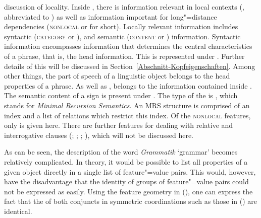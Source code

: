 discussion of locality. Inside \synsem, there is information relevant in local contexts (\local,
abbreviated to \loc) as well as information important for long"=distance dependencies
(\textsc{nonlocal} or \nonloc for short). Locally relevant information includes syntactic
(\textsc{category} or \cat), and semantic (\textsc{content} or \cont) information. Syntactic
information encompasses information that determines the central characteristics of a phrase, that
is, the head information. This is represented under \head. Further details of this will be discussed in
 Section~\ref{Abschnitt-Kopfeigenschaften}. Among other things, the part of speech of a 
 linguistic object belongs to the head properties of a phrase. As well as \head, \subcat belongs to the information contained inside \cat. The semantic content
 of a sign is present under \cont. The type of the \contv is , which stands for \emph{Minimal Recursion
Semantics}\indexmrs \citep*{CFPS2005a}. An MRS structure is comprised of an index and a list of
relations which restrict this index. Of the \textsc{nonlocal} features, only \slasch is given here. There are further features for dealing with relative
and interrogative clauses (\citealp{ps2}; \citealp{Sag97a};
\citealp{GSag2000a-u}; \citealp{Holler2005a-u}), which will not be discussed here.
\pagebreak

As can be seen, the description of the word \emph{Grammatik} `grammar' becomes relatively complicated. In theory, it would be possible to list all properties
of a given object directly in a single list of feature"=value pairs. This would, however, have the disadvantage that the identity of groups of feature"=value pairs could not be
expressed as easily. Using the feature geometry in (), one can express the fact that the \catvs of both conjuncts in symmetric coordinations
such as those in () are identical.\label{Seite-HPSG-Koordination}


